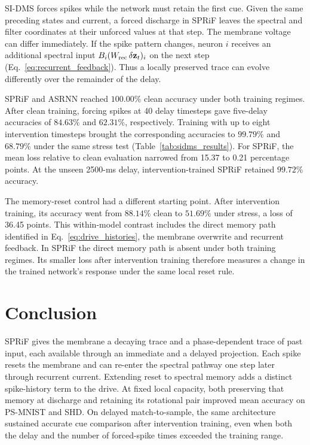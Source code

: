\documentclass[letterpaper,journal]{IEEEtran}
\begin{document}
SI-DMS forces spikes while the network must retain the first cue. Given the same preceding states and current, a forced discharge in SPRiF leaves the spectral and filter coordinates at their unforced values at that step. The membrane voltage can differ immediately. If the spike pattern changes, neuron $i$ receives an additional spectral input $B_i(W_{\rm rec}\,\delta\mathbf z_t)_i$ on the next step (Eq.~\eqref{eq:recurrent_feedback}). Thus a locally preserved trace can evolve differently over the remainder of the delay.

SPRiF and ASRNN reached $100.00\%$ clean accuracy under both training regimes. After clean training, forcing spikes at 40 delay timesteps gave five-delay accuracies of $84.63\%$ and $62.31\%$, respectively. Training with up to eight intervention timesteps brought the corresponding accuracies to $99.79\%$ and $68.79\%$ under the same stress test (Table~\ref{tab:sidms_results}). For SPRiF, the mean loss relative to clean evaluation narrowed from 15.37 to 0.21 percentage points. At the unseen 2500-ms delay, intervention-trained SPRiF retained $99.72\%$ accuracy.

The memory-reset control had a different starting point. After intervention training, its accuracy went from $88.14\%$ clean to $51.69\%$ under stress, a loss of 36.45 points. This within-model contrast includes the direct memory path identified in Eq.~\eqref{eq:drive_histories}, the membrane overwrite and recurrent feedback. In SPRiF the direct memory path is absent under both training regimes. Its smaller loss after intervention training therefore measures a change in the trained network's response under the same local reset rule.

\section{Conclusion}
\label{sec:conclusion}

SPRiF gives the membrane a decaying trace and a phase-dependent trace of past input, each available through an immediate and a delayed projection. Each spike resets the membrane and can re-enter the spectral pathway one step later through recurrent current. Extending reset to spectral memory adds a distinct spike-history term to the drive. At fixed local capacity, both preserving that memory at discharge and retaining its rotational pair improved mean accuracy on PS-MNIST and SHD. On delayed match-to-sample, the same architecture sustained accurate cue comparison after intervention training, even when both the delay and the number of forced-spike times exceeded the training range.



\end{document}
